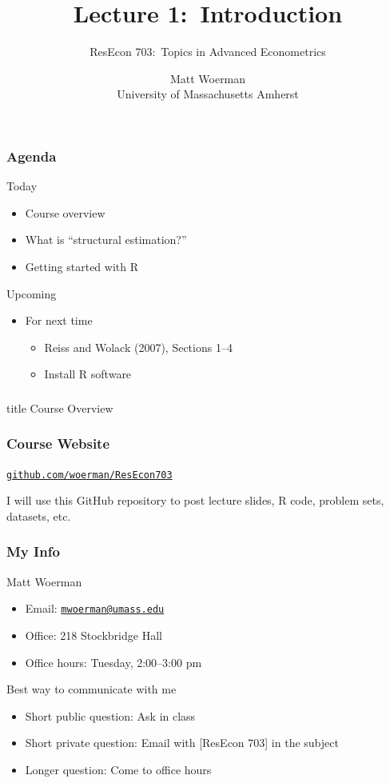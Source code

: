 \documentclass{beamer}\usepackage[]{graphicx}\usepackage[]{color}
\title[Lecture 1:\ Introduction]{Lecture 1:\ Introduction}
\author[ResEcon 703:\ Advanced Econometrics]{ResEcon 703:\ Topics in Advanced Econometrics}
\date{Matt Woerman\\University of Massachusetts Amherst}
\begin{document}
{ 
\begin{frame}[noframenumbering]
    \titlepage
\end{frame}
}

\begin{frame}\frametitle{Agenda}
    Today
    \begin{itemize}
        \item Course overview
        \item What is ``structural estimation?''
        \item Getting started with R
    \end{itemize}
    \vspace{3ex}
    Upcoming
    \begin{itemize}
        \item For next time
        \begin{itemize}
            \item Reiss and Wolack (2007), Sections 1--4
            \item Install R software
        \end{itemize}
    \end{itemize}
\end{frame}

\begin{frame}\frametitle{}
    \vfill
    \centering
    \begin{beamercolorbox}[center]{title}
        \Large Course Overview
    \end{beamercolorbox}
    \vfill
\end{frame}

\begin{frame}\frametitle{Course Website}
    \begin{center}
        \href{https://github.com/woerman/ResEcon703}{\texttt{github.com/woerman/ResEcon703}}
    \end{center}
    \vspace{3ex}
    I will use this GitHub repository to post lecture slides, R code, problem sets, datasets, etc.
\end{frame}

\begin{frame}\frametitle{My Info}
    Matt Woerman
    \begin{itemize}
        \item Email: \href{mailton:mwoerman@umass.edu}{\texttt{mwoerman@umass.edu}}
        \item Office: 218 Stockbridge Hall
        \item Office hours: Tuesday, 2:00--3:00 pm
    \end{itemize}
    \vspace{3ex}
    Best way to communicate with me
    \begin{itemize}
        \item Short public question: Ask in class
        \item Short private question: Email with [ResEcon 703] in the subject
        \item Longer question: Come to office hours
    \end{itemize}
\end{frame}
\end{document}
